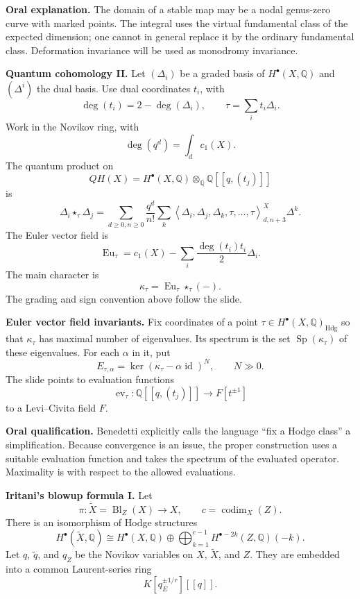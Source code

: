 \textbf{Oral explanation.}
The domain of a stable map may be a nodal
genus-zero curve with marked points.
The integral uses the virtual fundamental
class of the expected dimension; one cannot
in general replace it by the ordinary
fundamental class. Deformation invariance
will be used as monodromy invariance.

\medskip\noindent
\textbf{Quantum cohomology II.}
Let $(\Delta_i)$ be a graded basis of
$H^\bullet(X,\mathbb Q)$ and $(\Delta^i)$
the dual basis. Use dual coordinates $t_i$,
with
$$
\deg(t_i)=2-\deg(\Delta_i),\qquad
\tau=\sum_i t_i\Delta_i.
$$
Work in the Novikov ring, with
$$
\deg(q^d)=\int_d c_1(X).
$$
The quantum product on
$$
QH(X)=H^\bullet(X,\mathbb Q)
\otimes_{\mathbb Q}\mathbb Q[[q,(t_j)]]
$$
is
$$
\Delta_i\star_\tau\Delta_j
=
\sum_{d\geq0,n\geq0}\frac{q^d}{n!}
\sum_k
\left\langle\Delta_i,\Delta_j,\Delta_k,
\tau,\ldots,\tau\right\rangle^X_{d,n+3}
\Delta^k.
$$
The Euler vector field is
$$
\operatorname{Eu}_\tau=c_1(X)
-\sum_i\frac{\deg(t_i)t_i}{2}\Delta_i.
$$
The main character is
$$
\kappa_\tau=
\operatorname{Eu}_\tau\star_\tau(-).
$$
The grading and sign convention above
follow the slide.

\medskip\noindent
\textbf{Euler vector field invariants.}
Fix coordinates of a point
$\tau\in H^\bullet(X,\mathbb Q)
_{\mathrm{Hdg}}$
so that $\kappa_\tau$ has maximal number
of eigenvalues. Its spectrum is the set
$\operatorname{Sp}(\kappa_\tau)$ of these
eigenvalues. For each $\alpha$ in it, put
$$
E_{\tau,\alpha}=
\ker(\kappa_\tau-\alpha\operatorname{id})^N,
\qquad N\gg0.
$$
The slide points to evaluation functions
$$
\operatorname{ev}_\tau:
\mathbb Q[[q,(t_j)]]\longrightarrow
F[t^{\pm1}]
$$
to a Levi--Civita field $F$.

\textbf{Oral qualification.}
Benedetti explicitly calls the language
``fix a Hodge class'' a simplification.
Because convergence is an issue, the proper
construction uses a suitable evaluation
function and takes the spectrum of the
evaluated operator. Maximality is with
respect to the allowed evaluations.

\medskip\noindent
\textbf{Iritani's blowup formula I.}
Let
$$
\pi:\widetilde X=\operatorname{Bl}_Z(X)
\longrightarrow X,
\qquad c=\operatorname{codim}_X(Z).
$$
There is an isomorphism of Hodge structures
$$
H^\bullet(\widetilde X,\mathbb Q)
\cong H^\bullet(X,\mathbb Q)
\oplus\bigoplus_{k=1}^{c-1}
H^{\bullet-2k}(Z,\mathbb Q)(-k).
$$
Let $q$, $\widetilde q$, and $q_Z$ be the
Novikov variables on $X$, $\widetilde X$,
and $Z$. They are embedded into a common
Laurent-series ring
$$
K[q_E^{\pm1/r}][[q]].
$$

